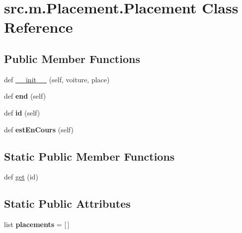 \hypertarget{classsrc_1_1m_1_1_placement_1_1_placement}{}\section{src.\+m.\+Placement.\+Placement Class Reference}
\label{classsrc_1_1m_1_1_placement_1_1_placement}
\subsection*{Public Member Functions}
\begin{DoxyCompactItemize}
\item 
def \hyperlink{classsrc_1_1m_1_1_placement_1_1_placement_af6f842988c471fb6125e2ba5161bfc59}{\+\_\+\+\_\+init\+\_\+\+\_\+} (self, voiture, place)
\item 
\hypertarget{classsrc_1_1m_1_1_placement_1_1_placement_a7cfebdb96fbce2a46b0ea24914cc2e04}{}def {\bfseries end} (self)\label{classsrc_1_1m_1_1_placement_1_1_placement_a7cfebdb96fbce2a46b0ea24914cc2e04}

\item 
\hypertarget{classsrc_1_1m_1_1_placement_1_1_placement_a5a254cc311b6a780f6eaef89defeecae}{}def {\bfseries id} (self)\label{classsrc_1_1m_1_1_placement_1_1_placement_a5a254cc311b6a780f6eaef89defeecae}

\item 
\hypertarget{classsrc_1_1m_1_1_placement_1_1_placement_a0a0873cd1494022bb2c73fcb18989cb2}{}def {\bfseries est\+En\+Cours} (self)\label{classsrc_1_1m_1_1_placement_1_1_placement_a0a0873cd1494022bb2c73fcb18989cb2}

\end{DoxyCompactItemize}
\subsection*{Static Public Member Functions}
\begin{DoxyCompactItemize}
\item 
def \hyperlink{classsrc_1_1m_1_1_placement_1_1_placement_a098cebb4e7d2c1a299ad3fec2e6bd96c}{get} (id)
\end{DoxyCompactItemize}
\subsection*{Static Public Attributes}
\begin{DoxyCompactItemize}
\item 
\hypertarget{classsrc_1_1m_1_1_placement_1_1_placement_a9fd6e4c366e2650ec495d65c5e188690}{}list {\bfseries placements} = \mbox{[}$\,$\mbox{]}\label{classsrc_1_1m_1_1_placement_1_1_placement_a9fd6e4c366e2650ec495d65c5e188690}

\end{DoxyCompactItemize}


